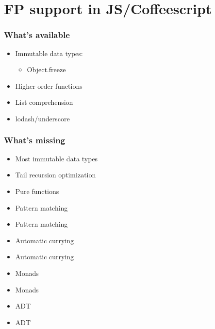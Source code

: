 \documentclass[18pt, compress, aspectratio=169]{beamer}
\def\fail{\textcolor{fail}{\FA \faRemove}}
\def\question{\textcolor{question}{\FA \faSearch}}
\begin{document}
\section{FP support in JS/Coffeescript}

\begin{frame}
    \frametitle{What's available}
    \vspace{-25pt}
    \begin{itemize}[label={\MVRightarrow}]
        \item <+->Immutable data types:
            \begin{itemize}
                \item Object.freeze
            \end{itemize}
        \item <+->Higher-order functions
        \item <+->List comprehension
        \item <+->lodash/underscore
    \end{itemize}
\end{frame}

\begin{frame}
    \frametitle{What's missing}
    \begin{overlayarea}{\textwidth}{.8\textheight}
    \begin{itemize}[label={\MVRightarrow}]
        \item <1->Most immutable data types \fail
        \item <1->Tail recursion optimization \fail
        \item <2->Pure functions \fail
        \item <3|only@3>Pattern matching \alt<3>{\fail}{\question}
        \item <4->Pattern matching \alt<3>{\fail}{\question}
        \item <5|only@5>Automatic currying \alt<5>{\fail}{\question}
        \item <6->Automatic currying \alt<5>{\fail}{\question}
        \item <7|only@7>Monads \alt<7>{\fail}{\question}
        \item <8->Monads \alt<7>{\fail}{\question}
        \item <9|only@9>ADT \alt<9>{\fail}{\question}
        \item <10->ADT \alt<9>{\fail}{\question}
    \end{itemize}
    \end{overlayarea}
\end{frame}
\end{document}
